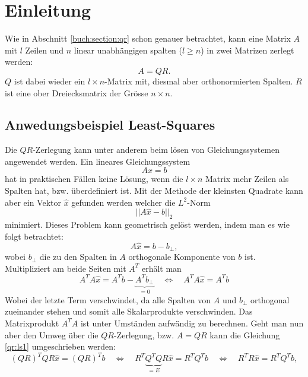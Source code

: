 %
%
%
\section{Einleitung\label{qr:section:einleitung}}
Wie in Abschnitt \ref{buch:section:qr} schon genauer betrachtet, kann eine Matrix $A$ mit $l$ Zeilen und $n$ linear unabhängigen spalten ($l\ge n$) in zwei Matrizen zerlegt werden:
\begin{equation*}
A=QR.
\end{equation*}
$Q$ ist dabei wieder ein $l\times n$-Matrix mit, diesmal aber orthonormierten Spalten.
$R$ ist eine ober Dreiecksmatrix der Grösse $n\times n$.

\subsection{Anwedungsbeispiel Least-Squares\label{qr:section:ls}}
Die $QR$-Zerlegung kann unter anderem beim lösen von Gleichungssystemen angewendet werden.
Ein lineares Gleichungssystem
\begin{equation}
Ax=b\label{qr:sle}
\end{equation}
hat in praktischen Fällen keine Lösung, wenn die $l\times n$ Matrix mehr Zeilen als Spalten hat, bzw. überdefiniert ist.
Mit der Methode der kleinsten Quadrate kann aber ein Vektor $\hat{x}$ gefunden werden welcher die $L^2$-Norm
\begin{equation*}
||A\hat{x}-b||_2
\end{equation*}
minimiert.
Dieses Problem kann geometrisch gelöst werden, indem man es wie folgt betrachtet:
\begin{equation*}
A\hat{x}=b-b_{\perp},
\end{equation*}
wobei $b_{\perp}$ die zu den Spalten in $A$ orthogonale Komponente von $b$ ist.
Multipliziert am beide Seiten mit $A^T$ erhält man
\begin{equation}
A^TA\hat{x}=A^Tb-\underbrace{A^Tb_{\perp}}_{=0}
\quad\Leftrightarrow\quad A^TA\hat{x}=A^Tb \label{qr:ls1}
\end{equation}
Wobei der letzte Term verschwindet, da alle Spalten von $A$ und $b_{\perp}$ orthogonal zueinander stehen und somit alle Skalarprodukte verschwinden.
Das Matrixprodukt $A^TA$ ist unter Umständen aufwändig zu berechnen.
Geht man nun aber den Umweg über die $QR$-Zerlegung, bzw. $A=QR$ kann die Gleichung \ref{qr:ls1} umgeschrieben werden:
\begin{equation*}
(QR)^TQR\hat{x}=(QR)^Tb \quad \Leftrightarrow \quad R^T\underbrace{Q^TQ}_{=E}R\hat{x}= R^TQ^Tb \quad \Leftrightarrow \quad
R^TR\hat{x}=R^TQ^Tb,
\end{equation*}
